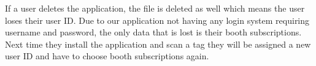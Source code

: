If a user deletes the application, the file is deleted as well which means the user loses their user ID. Due to our application not having any login system requiring username and password, the only data that is lost is their booth subscriptions. Next time they install the application and scan a tag they will be assigned a new user ID and have to choose booth subscriptions again.
